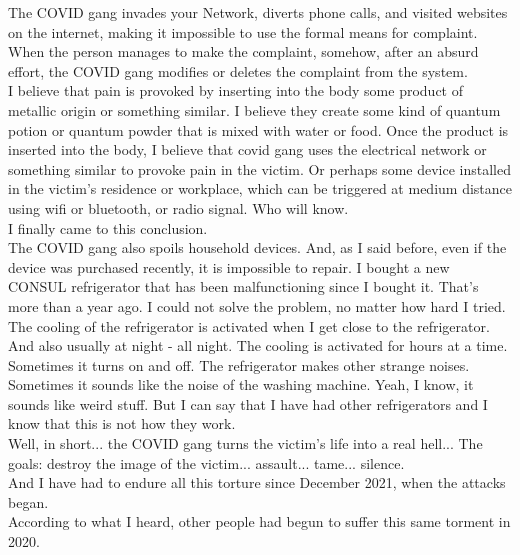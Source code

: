 \documentclass[11pt]{book}
\begin{document}
\noindent The COVID gang invades your Network, diverts phone calls, and visited websites on the internet, making it impossible to use the formal means for complaint. \\

\noindent When the person manages to make the complaint, somehow, after an absurd effort, the COVID gang modifies or deletes the complaint from the system. \\

\noindent I believe that pain is provoked by inserting into the body some product of metallic origin or something similar. I believe they create some kind of quantum potion or quantum powder that is mixed with water or food. Once the product is inserted into the body, I believe that covid gang uses the electrical network or something similar to provoke pain in the victim. Or perhaps some device installed in the victim's residence or workplace, which can be triggered at medium distance using wifi or bluetooth, or radio signal. Who will know. \\

\noindent I finally came to this conclusion. \\

\noindent The COVID gang also spoils household devices. And, as I said before, even if the device was purchased recently, it is impossible to repair. I bought a new CONSUL refrigerator that has been malfunctioning since I bought it. That's more than a year ago. I could not solve the problem, no matter how hard I tried. The cooling of the refrigerator is activated when I get close to the refrigerator. And also usually at night - all night. The cooling is activated for hours at a time. Sometimes it turns on and off. The refrigerator makes other strange noises. Sometimes it sounds like the noise of the washing machine. Yeah, I know, it sounds like weird stuff. But I can say that I have had other refrigerators and I know that this is not how they work. \\

\noindent Well, in short... the COVID gang turns the victim's life into a real hell... The goals: destroy the image of the victim... assault... tame... silence. \\

\noindent And I have had to endure all this torture since December 2021, when the attacks began. \\

\noindent According to what I heard, other people had begun to suffer this same torment in 2020. \\
\end{document}
